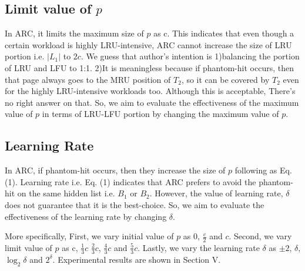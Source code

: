 \subsection{Limit value of $p$}
In ARC, it limits the maximum size of $p$ as c. This indicates that even though a certain workload is highly LRU-intensive, ARC cannot increase the size of LRU portion i.e. $|L_1|$ to $2c$. We guess that author's intention is 1)balancing the portion of LRU and LFU to 1:1. 2)It is meaningless because if phantom-hit occurs, then that page always goes to the MRU position of $T_2$, so it can be covered by $T_2$ even for the highly LRU-intensive workloads too. Although this is acceptable, There's no right answer on that. So, we aim to evaluate the effectiveness of the maximum value of $p$ in terms of LRU-LFU portion by changing the maximum value of $p$. 


\subsection{Learning Rate}
In ARC, if phantom-hit occurs, then they increase the size of $p$ following as Eq. (1). Learning rate i.e. Eq. (1) indicates that ARC prefers to avoid the phantom-hit on the same hidden list i.e. $B_1$ or $B_2$. However, the value of learning rate, $\delta$ does not guarantee that it is the best-choice. So, we aim to evaluate the effectiveness of the learning rate by changing $\delta$.

More specifically, First, we vary initial value of $p$ as 0, $\frac{c}{2}$ and $c$. Second, we vary limit value of $p$ as c, $\frac{1}{3}c$ $\frac{2}{3}c$, $\frac{4}{3}c$ and $\frac{5}{3}c$. Lastly, we vary the learning rate $\delta$ as $\pm2$, $\delta$, $\log_2{\delta}$ and $2^\delta$. Experimental results are shown in Section V.






